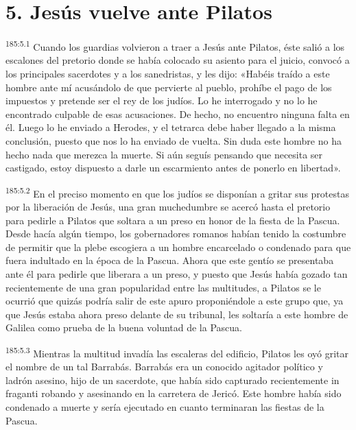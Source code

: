 \section*{5. Jesús vuelve ante Pilatos}
\par 
\textsuperscript{185:5.1} Cuando los guardias volvieron a traer a Jesús ante Pilatos, éste salió a los escalones del pretorio donde se había colocado su asiento para el juicio, convocó a los principales sacerdotes y a los sanedristas, y les dijo: «Habéis traído a este hombre ante mí acusándolo de que pervierte al pueblo, prohíbe el pago de los impuestos y pretende ser el rey de los judíos. Lo he interrogado y no lo he encontrado culpable de esas acusaciones. De hecho, no encuentro ninguna falta en él. Luego lo he enviado a Herodes, y el tetrarca debe haber llegado a la misma conclusión, puesto que nos lo ha enviado de vuelta. Sin duda este hombre no ha hecho nada que merezca la muerte. Si aún seguís pensando que necesita ser castigado, estoy dispuesto a darle un escarmiento antes de ponerlo en libertad».

\par 
\textsuperscript{185:5.2} En el preciso momento en que los judíos se disponían a gritar sus protestas por la liberación de Jesús, una gran muchedumbre se acercó hasta el pretorio para pedirle a Pilatos que soltara a un preso en honor de la fiesta de la Pascua. Desde hacía algún tiempo, los gobernadores romanos habían tenido la costumbre de permitir que la plebe escogiera a un hombre encarcelado o condenado para que fuera indultado en la época de la Pascua. Ahora que este gentío se presentaba ante él para pedirle que liberara a un preso, y puesto que Jesús había gozado tan recientemente de una gran popularidad entre las multitudes, a Pilatos se le ocurrió que quizás podría salir de este apuro proponiéndole a este grupo que, ya que Jesús estaba ahora preso delante de su tribunal, les soltaría a este hombre de Galilea como prueba de la buena voluntad de la Pascua.

\par 
\textsuperscript{185:5.3} Mientras la multitud invadía las escaleras del edificio, Pilatos les oyó gritar el nombre de un tal Barrabás. Barrabás era un conocido agitador político y ladrón asesino, hijo de un sacerdote, que había sido capturado recientemente in fraganti robando y asesinando en la carretera de Jericó. Este hombre había sido condenado a muerte y sería ejecutado en cuanto terminaran las fiestas de la Pascua.

